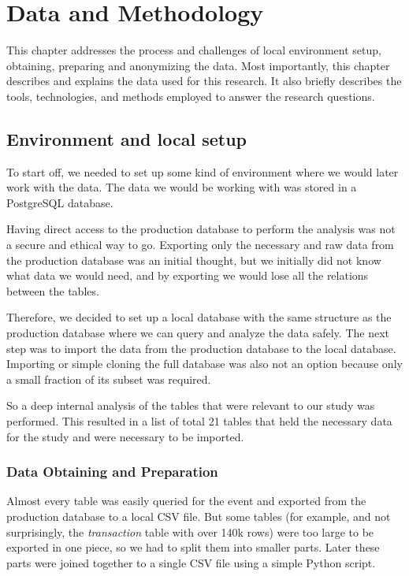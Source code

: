 \chapter{Data and Methodology}
\label{ch:data-methodology}
This chapter addresses the process and challenges of local environment setup, obtaining, preparing and anonymizing the data.
Most importantly, this chapter describes and explains the data used for this research.
It also briefly describes the tools, technologies, and methods employed to answer the research questions.


\section{Environment and local setup}
\label{sec:data-methodology-environment}

To start off, we needed to set up some kind of environment where we would later work with the data.
The data we would be working with was stored in a PostgreSQL database.

Having direct access to the production database to perform the analysis was not a secure and ethical way to go.
Exporting only the necessary and raw data from the production database was an initial thought, but we initially did not know what data we would need, and by exporting we would lose all the relations between the tables.

Therefore, we decided to set up a local database with the same structure as the production database where we can query and analyze the data safely.
The next step was to import the data from the production database to the local database.
Importing or simple cloning the full database was also not an option because only a small fraction of its subset was required.

So a deep internal analysis of the tables that were relevant to our study was performed.
This resulted in a list of total 21 tables that held the necessary data for the study and were necessary to be imported.

\subsection{Data Obtaining and Preparation}
\label{subsec:data-methodology-obtaining-preparation}

Almost every table was easily queried for the event and exported from the production database to a local CSV file.
But some tables (for example, and not surprisingly, the \textit{transaction} table with over 140k rows) were too large to be exported in one piece, so we had to split them into smaller parts.
Later these parts were joined together to a single CSV file using a simple Python script.

